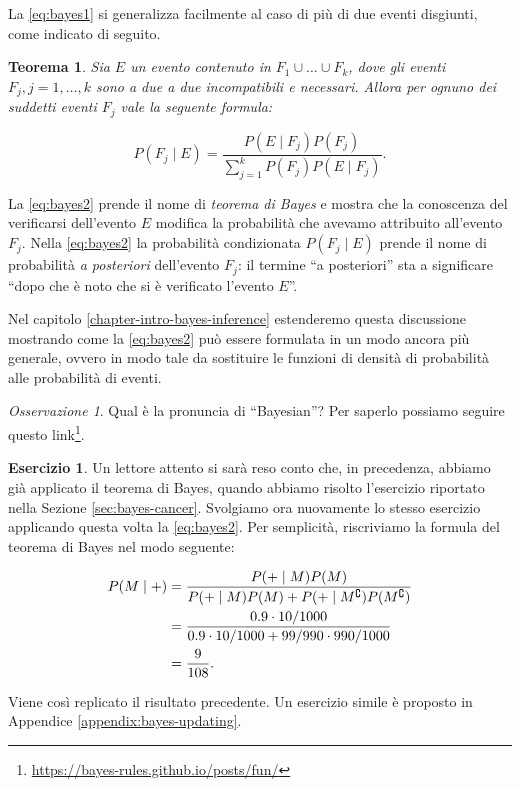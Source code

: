 \documentclass[
  11pt,
]{krantz}
\renewcommand{\href}[2]{#2\footnote{\url{#1}}}
\newtheorem{theorem}{Teorema}[chapter]
\theoremstyle{definition}
\theoremstyle{definition}
\theoremstyle{definition}
\newtheorem{exercise}{Esercizio}[chapter]
\theoremstyle{definition}
\theoremstyle{remark}
\newtheorem*{remark}{Osservazione}
\begin{document}
\noindent La \eqref{eq:bayes1} si generalizza facilmente al caso di più di due eventi disgiunti, come indicato di seguito.

\begin{theorem}
Sia \(E\) un evento contenuto in \(F_1 \cup \dots \cup F_k\), dove gli eventi \(F_j, j=1, \dots, k\) sono a due a due incompatibili e necessari. Allora per ognuno dei suddetti eventi \(F_j\) vale la seguente formula:

\begin{equation}
P(F_j \mid E) = \frac{P(E \mid F_j)P(F_j)}{\sum_{j=1}^{k}P(F_j)P(E \mid F_j)}.
\label{eq:bayes2}
\end{equation}
\end{theorem}

\noindent La \eqref{eq:bayes2} prende il nome di \emph{teorema di Bayes} e mostra che la conoscenza del verificarsi dell'evento \(E\) modifica la probabilità che avevamo attribuito all'evento \(F_j\). Nella \eqref{eq:bayes2} la probabilità condizionata \(P(F_j \mid E)\) prende il nome di probabilità \emph{a posteriori} dell'evento \(F_j\): il termine ``a posteriori'' sta a significare ``dopo che è noto che si è verificato l'evento \(E\)''.

Nel capitolo \ref{chapter-intro-bayes-inference} estenderemo questa discussione mostrando come la \eqref{eq:bayes2} può essere formulata in un modo ancora più generale, ovvero in modo tale da sostituire le funzioni di densità di probabilità alle probabilità di eventi.

\begin{remark}
Qual è la pronuncia di ``Bayesian''? Per saperlo possiamo seguire \href{https://bayes-rules.github.io/posts/fun/}{questo link}.
\end{remark}

\begin{exercise}
Un lettore attento si sarà reso conto che, in precedenza, abbiamo già applicato il teorema di Bayes, quando abbiamo risolto l'esercizio riportato nella Sezione \ref{sec:bayes-cancer}. Svolgiamo ora nuovamente lo stesso esercizio applicando questa volta la \eqref{eq:bayes2}. Per semplicità, riscriviamo la formula del teorema di Bayes nel modo seguente:

\begin{align}
P(M \mid +) &= \frac{P(+ \mid M) P(M)}{P(+ \mid M) P(M) + P(+ \mid M^\complement) P(M^\complement)}\notag\\ 
&= \frac{0.9 \cdot 10/1000}{0.9 \cdot 10/1000 + 99 / 990 \cdot 990 / 1000} \notag\\
&= \frac{9}{108}.
\end{align}

Viene così replicato il risultato precedente. Un esercizio simile è proposto in Appendice \ref{appendix:bayes-updating}.
\end{exercise}
\end{document}
